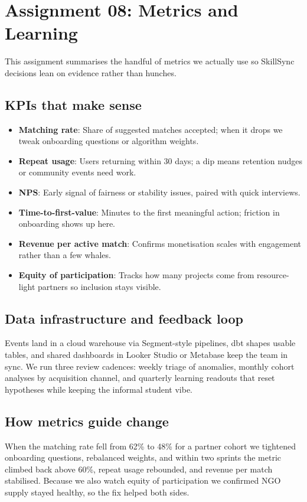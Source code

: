 \section*{Assignment 08: Metrics and Learning}

This assignment summarises the handful of metrics we actually use so SkillSync decisions lean on evidence rather than hunches.

\subsection*{KPIs that make sense}
\begin{itemize}
    \item \textbf{Matching rate}: Share of suggested matches accepted; when it drops we tweak onboarding questions or algorithm weights.
    \item \textbf{Repeat usage}: Users returning within 30 days; a dip means retention nudges or community events need work.
    \item \textbf{NPS}: Early signal of fairness or stability issues, paired with quick interviews.
    \item \textbf{Time-to-first-value}: Minutes to the first meaningful action; friction in onboarding shows up here.
    \item \textbf{Revenue per active match}: Confirms monetisation scales with engagement rather than a few whales.
    \item \textbf{Equity of participation}: Tracks how many projects come from resource-light partners so inclusion stays visible.
\end{itemize}

\subsection*{Data infrastructure and feedback loop}
Events land in a cloud warehouse via Segment-style pipelines, dbt shapes usable tables, and shared dashboards in Looker Studio or Metabase keep the team in sync. We run three review cadences: weekly triage of anomalies, monthly cohort analyses by acquisition channel, and quarterly learning readouts that reset hypotheses while keeping the informal student vibe.

\subsection*{How metrics guide change}
When the matching rate fell from 62\% to 48\% for a partner cohort we tightened onboarding questions, rebalanced weights, and within two sprints the metric climbed back above 60\%, repeat usage rebounded, and revenue per match stabilised. Because we also watch equity of participation we confirmed NGO supply stayed healthy, so the fix helped both sides.

